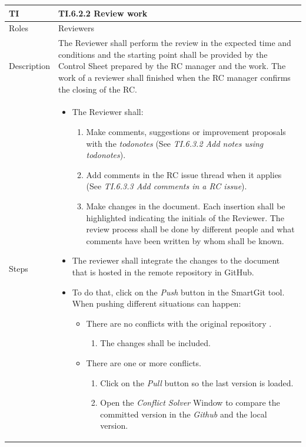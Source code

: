 \documentclass{template/openetcs_article}
\begin{document}
\begin{flushleft}
\tablefirsthead{}
\tablehead{}
\tabletail{}
\tablelasttail{}
\begin{supertabular}{|m{2cm}|m{13cm}|}
\hline
{}
TI & 
TI.6.2.2 Review work
\\\hline
Roles &
Reviewers
\\\hline
Description &
The Reviewer shall perform the review in the expected time and conditions and the starting point shall be provided by the Control Sheet prepared by the RC manager and the work. The work of a reviewer shall finished when the RC manager confirms the closing of the RC.
\\\hline
Steps &
\begin{itemize}
\item The Reviewer shall:
\begin{enumerate}
\item Make comments, suggestions or improvement proposals with the {\it todonotes} (See {\it TI.6.3.2 Add notes using todonotes}).
\item Add comments in the RC issue thread when it applies (See {\it TI.6.3.3 Add comments in a RC issue}).
\item Make changes in the document. Each insertion shall be highlighted indicating the initials of the Reviewer. The review process shall be done by different people and what comments have been written by whom shall be known.
\end{enumerate}
\item The reviewer shall integrate the changes to the document that is hosted in the remote repository in GitHub. 
\item To do that, click on the {\it Push} button in the SmartGit tool. When pushing different situations can happen:
\begin{itemize}
\item There are no conflicts with the original repository .
\begin{enumerate}
\item The changes shall be included.
\end{enumerate}
\end{itemize}
\begin{itemize}
\item There are one or more conflicts.
\begin{enumerate}
\item Click on the {\it Pull} button so the last version is loaded. 
\item Open the {\it Conflict Solver} Window to compare the committed version in the {\it Github} and the local version. 

\end{enumerate}
\end{itemize}
\end{itemize}
\end{supertabular}
\end{flushleft}
\end{document}
